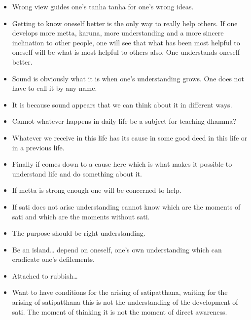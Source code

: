 \documentclass{article}
\begin{document}
\begin{itemize}
\item 
  Wrong view guides one's tanha tanha for one's wrong ideas.

\item 
  Getting to know oneself better is the only way to really help
  others. If one develops more metta, karuna, more understanding and
  a more sincere inclination to other people, one will see that what
  has been most helpful to oneself will be what is most helpful to
  others also. One understands oneself better.

\item 
  Sound is obviously what it is when one's understanding grows. One
  does not have to call it by any name.

\item 
  It is because sound appears that we can think about it in different
  ways.

\item 
  Cannot whatever happens in daily life be a subject for teaching
  dhamma?

\item 
  Whatever we receive in this life has its cause in some good deed in
  this life or in a previous life.

\item 
  Finally if comes down to a cause here which is what makes it
  possible to understand life and do something about it.

\item 
  If metta is strong enough one will be concerned to help.

\item 
  If sati does not arise understanding cannot know which are the
  moments of sati and which are the moments without sati.

\item 
  The purpose should be right understanding.

\item 
  Be an island\ldots{} depend on oneself, one's own understanding
  which can eradicate one's defilements.

\item 
  Attached to rubbish\ldots{}

\item 
  Want to have conditions for the arising of satipatthana, waiting
  for the arising of satipatthana this is not the understanding of
  the development of sati. The moment of thinking it is not the
  moment of direct awareness.


\end{itemize}
\end{document}
